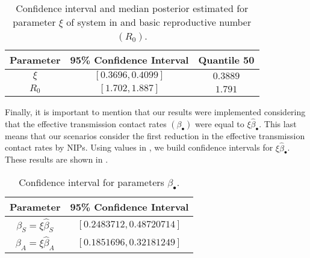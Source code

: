 \begin{table}[h!]
\begin{center}
	\begin{tabular}{ccc}
		\toprule
	    Parameter & 95\% Confidence Interval & Quantile 50
			\\
			\midrule
            $\xi$     & $[0.3696, 0.4099]$  & $0.3889$  \\
            $R_0$ & $[1.702, 1.887]$ &  $1.791$ \\
			\bottomrule
	\end{tabular}
  \caption{Confidence interval and median posterior estimated for
  parameter $\xi$ of system in  and basic
  reproductive number $(R_0)$.}\label{table_icparam2}
\end{center}
\end{table}

Finally, it is important to mention that our results were implemented
considering that the effective transmission contact rates
$(\beta_{\bullet})$ were equal to $\xi\hat{\beta}_{\bullet}$. This
last means that our scenarios consider the first reduction in the
effective transmission contact rates by NIPs. Using values in
, we build confidence intervals for
$\xi\hat{\beta}_{\bullet}$. These results are shown in
.
\begin{table}[h!]
\begin{center}
	\begin{tabular}{cc}
		\toprule
	    Parameter & 95\% Confidence Interval
			\\
			\midrule
            $\beta_S = \xi\hat{\beta}_S$ & $[0.2483712, 0.48720714]$ \\
            $\beta_A = \xi\hat{\beta}_A$ & $[0.1851696, 0.32181249]$ \\
			\bottomrule
	\end{tabular}
  \caption{Confidence interval for parameters
  $\beta_{\bullet}$.}\label{table_icparam3}
\end{center}
\end{table}
